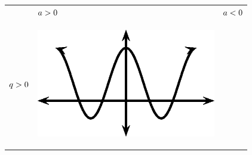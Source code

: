        \begin{center}
      \label{m39414*uid65}
    \noindent
      \tablelasttail{}
      \begin{xtabular*}{\mytablewidth}[t]{|p{10\mystarwidth}|p{10\mystarwidth}|p{10\mystarwidth}|}\hline
         &
                  $a>{}0$
                 &
                  $a<{}0$
     \tabularnewline{}
                  $q>{}0$
                 &
    \setcounter{subfigure}{0}
\label{m39414*id88184}
    \begin{center}
    \label{m39414*id88184!!!underscore!!!media}\label{m39414*id88184!!!underscore!!!printimage}\includegraphics{col11306.imgs/m39414_MG10C15_026.png} %
      \vspace{2pt}
    \vspace{.1in}
    \end{center}    

\end{xtabular*}
\end{center}
